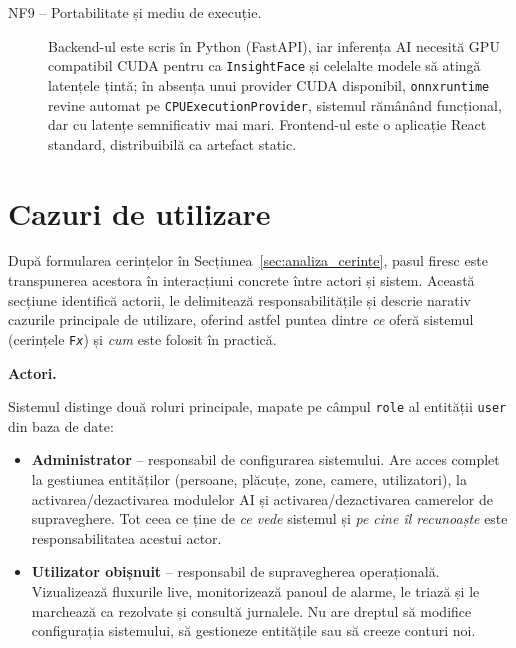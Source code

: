\documentclass[../../main.tex]{subfiles}
\begin{document}
\begin{description}
    \item[NF9 -- Portabilitate și mediu de execuție.] Backend-ul este scris în Python \linebreak (FastAPI), iar inferența AI necesită GPU compatibil CUDA pentru ca \texttt{InsightFace} și celelalte modele să atingă latențele țintă; în absența unui provider CUDA disponibil, \texttt{onnxruntime} revine automat pe \linebreak \texttt{CPUExecutionProvider}, sistemul rămânând funcțional, dar cu latențe semnificativ mai mari. Frontend-ul este o aplicație React standard, distribuibilă ca artefact static.
\end{description}

\section{Cazuri de utilizare}
\label{sec:cazuri_utilizare}

După formularea cerințelor în Secțiunea~\ref{sec:analiza_cerinte}, pasul firesc este transpunerea acestora în interacțiuni concrete între actori și sistem. Această secțiune identifică actorii, le delimitează responsabilitățile și descrie narativ cazurile principale de utilizare, oferind astfel puntea dintre \emph{ce} oferă sistemul (cerințele \texttt{F\textit{x}}) și \emph{cum} este folosit în practică.

\noindent\textbf{Actori.}

Sistemul distinge două roluri principale, mapate pe câmpul \texttt{role} al entității \texttt{user} din baza de date:

\begin{itemize}
    \item \textbf{Administrator} -- responsabil de configurarea sistemului. Are acces complet la gestiunea entităților (persoane, plăcuțe, zone, camere, utilizatori), la activarea/dezactivarea modulelor AI și activarea/dezactivarea camerelor de supraveghere. Tot ceea ce ține de \emph{ce vede} sistemul și \emph{pe cine îl recunoaște} este responsabilitatea acestui actor.
    \item \textbf{Utilizator obișnuit} -- responsabil de supravegherea operațională. \linebreak Vizualizează fluxurile live, monitorizează panoul de alarme, le triază și le marchează ca rezolvate și consultă jurnalele. Nu are dreptul să modifice configurația sistemului, să gestioneze entitățile sau să creeze conturi noi.
\end{itemize}
\end{document}
